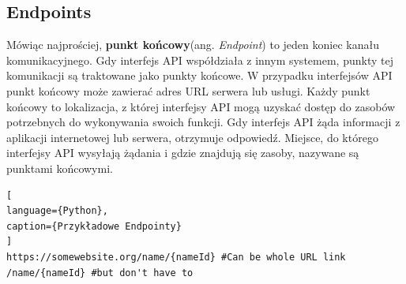 \documentclass[oneside,polski,logo,indent]{amuthesis}
\begin{document}
\begin{center}
\subsection{Endpoints}
\end{center}
Mówiąc najprościej, \textbf{punkt końcowy}(ang. \emph{Endpoint}) to jeden koniec kanału komunikacyjnego. Gdy interfejs API współdziała z innym systemem, punkty tej komunikacji są traktowane jako punkty końcowe. W przypadku interfejsów API punkt końcowy może zawierać adres URL serwera lub usługi. Każdy punkt końcowy to lokalizacja, z której interfejsy API mogą uzyskać dostęp do zasobów potrzebnych do wykonywania swoich funkcji. Gdy interfejs API żąda informacji z aplikacji internetowej lub serwera, otrzymuje odpowiedź. Miejsce, do którego interfejsy API wysyłają żądania i gdzie znajdują się zasoby, nazywane są punktami końcowymi.

\begin{lstlisting}[
language={Python},
caption={Przykładowe Endpointy}
]
https://somewebsite.org/name/{nameId} #Can be whole URL link
/name/{nameId} #but don't have to
\end{lstlisting}
\end{document}
